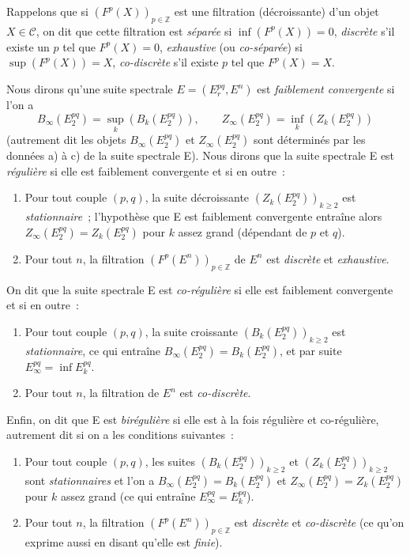 Rappelons que si $(F^p(X))_{p\in\mathbb Z}$ est une filtration (décroissante)
d'un objet $X\in\mathcal C$, on dit que cette filtration est \emph{séparée}
si $\inf(F^p(X))=0$, \emph{discrète} s'il existe un $p$ tel que $F^p(X)=0$,
\emph{exhaustive} (ou \emph{co-séparée}) si $\sup(F^p(X))=X$,
\emph{co-discrète} s'il existe $p$ tel que $F^p(X)=X$.

Nous dirons qu'une suite spectrale $E=(E_r^{pq},E^n)$ est \emph{faiblement
convergente} si l'on a
\[
  B_\infty(E_2^{pq})=\sup_k(B_k(E_2^{pq})),\qquad
  Z_\infty(E_2^{pq})=\inf_k(Z_k(E_2^{pq}))
\]
(autrement dit les objets $B_\infty(E_2^{pq})$ et $Z_\infty(E_2^{pq})$
sont déterminés par les données a) à c) de la suite spectrale E). Nous dirons
que la suite spectrale E est \emph{régulière} si elle est faiblement
convergente et si en outre~:
\begin{enumerate}
  \item[$1^\circ$] Pour tout couple $(p,q)$, la suite décroissante
    $(Z_k(E_2^{pq}))_{k\geq2}$ est \emph{stationnaire}~; l'hypothèse que E
    est faiblement convergente entraîne alors
    $Z_\infty(E_2^{pq})=Z_k(E_2^{pq})$ pour $k$ assez grand (dépendant de
    $p$ et $q$).
  \item[$2^\circ$] Pour tout $n$, la filtration
    $(F^p(E^n))_{p\in\mathbb Z}$ de $E^n$ est \emph{discrète} et
    \emph{exhaustive}.
\end{enumerate}

On dit que la suite spectrale E est \emph{co-régulière} si elle est
faiblement convergente et si en outre~:
\begin{enumerate}
  \item[$3^\circ$] Pour tout couple $(p,q)$, la suite croissante
    $(B_k(E_2^{pq}))_{k\geq2}$ est \emph{stationnaire}, ce qui entraîne
    $B_\infty(E_2^{pq})=B_k(E_2^{pq})$, et par suite
    $E_\infty^{pq}=\inf E_k^{pq}$.
  \item[$4^\circ$] Pour tout $n$, la filtration de $E^n$ est
    \emph{co-discrète}.
\end{enumerate}

Enfin, on dit que E est \emph{birégulière} si elle est à la fois régulière
et co-régulière, autrement dit si on a les conditions suivantes~:
\begin{enumerate}
  \item[(a)] Pour tout couple $(p,q)$, les suites
    $(B_k(E_2^{pq}))_{k\geq2}$ et $(Z_k(E_2^{pq}))_{k\geq2}$ sont
    \emph{stationnaires} et l'on a
    $B_\infty(E_2^{pq})=B_k(E_2^{pq})$ et
    $Z_\infty(E_2^{pq})=Z_k(E_2^{pq})$ pour $k$ assez grand (ce qui entraîne
    $E_\infty^{pq}=E_k^{pq}$).
  \item[(b)] Pour tout $n$, la filtration $(F^p(E^n))_{p\in\mathbb Z}$ est
    \emph{discrète} et \emph{co-discrète} (ce qu'on exprime aussi en disant
    qu'elle est \emph{finie}).
\end{enumerate}

